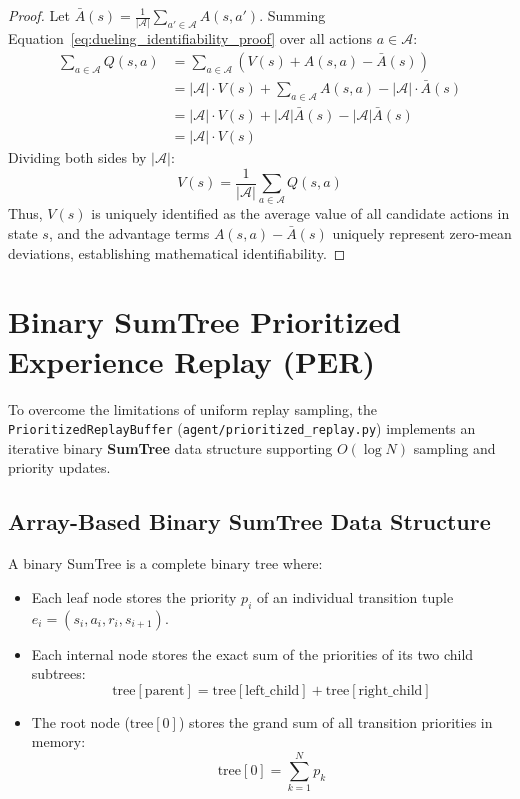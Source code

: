 \begin{proof}
Let $\bar{A}(s) = \frac{1}{|\mathcal{A}|} \sum_{a' \in \mathcal{A}} A(s, a')$. Summing Equation~\ref{eq:dueling_identifiability_proof} over all actions $a \in \mathcal{A}$:
\begin{align}
    \sum_{a \in \mathcal{A}} Q(s, a) &= \sum_{a \in \mathcal{A}} \left( V(s) + A(s, a) - \bar{A}(s) \right) \nonumber \\
    &= |\mathcal{A}| \cdot V(s) + \sum_{a \in \mathcal{A}} A(s, a) - |\mathcal{A}| \cdot \bar{A}(s) \nonumber \\
    &= |\mathcal{A}| \cdot V(s) + |\mathcal{A}| \bar{A}(s) - |\mathcal{A}| \bar{A}(s) \nonumber \\
    &= |\mathcal{A}| \cdot V(s)
\end{align}
Dividing both sides by $|\mathcal{A}|$:
\begin{equation}
    V(s) = \frac{1}{|\mathcal{A}|} \sum_{a \in \mathcal{A}} Q(s, a)
\end{equation}
Thus, $V(s)$ is uniquely identified as the average value of all candidate actions in state $s$, and the advantage terms $A(s, a) - \bar{A}(s)$ uniquely represent zero-mean deviations, establishing mathematical identifiability.
\end{proof}

\section{Binary SumTree Prioritized Experience Replay (PER)}
To overcome the limitations of uniform replay sampling, the \texttt{PrioritizedReplayBuffer} (\texttt{agent/prioritized\_replay.py}) implements an iterative binary \textbf{SumTree} data structure supporting $O(\log N)$ sampling and priority updates.

\subsection{Array-Based Binary SumTree Data Structure}
A binary SumTree is a complete binary tree where:
\begin{itemize}
    \item Each leaf node stores the priority $p_i$ of an individual transition tuple $e_i = (s_i, a_i, r_i, s_{i+1})$.
    \item Each internal node stores the exact sum of the priorities of its two child subtrees:
    \begin{equation}
        \text{tree}[\text{parent}] = \text{tree}[\text{left\_child}] + \text{tree}[\text{right\_child}]
    \end{equation}
    \item The root node ($\text{tree}[0]$) stores the grand sum of all transition priorities in memory:
    \begin{equation}
        \text{tree}[0] = \sum_{k=1}^N p_k
    \end{equation}
\end{itemize}

